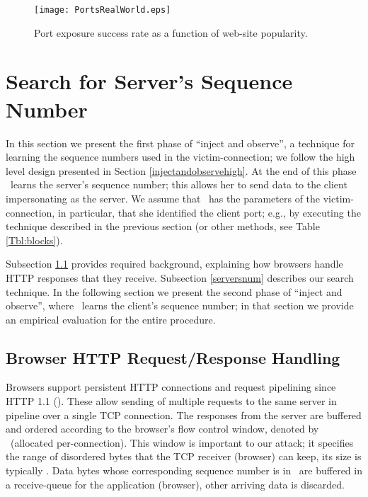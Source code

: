 \documentclass[conference]{IEEEtran}
\newcommand{\wnd}{}
\newcommand{\cwnd}{}
\begin{document}
{\begin{figure}
  \begin{center}
    \texttt{[image: PortsRealWorld.eps]}
  \end{center}
  \caption{Port exposure success rate as a function of web-site popularity.}
    \label{fig:portexposurereal}
\end{figure}
}



\section{Search for Server's Sequence Number} \label{serverseq}

In this section we present the first phase of ``inject and observe'', a technique for learning the sequence numbers used in the victim-connection; we follow the high level design presented in Section \ref{injectandobservehigh}. At the end of this phase \mal\ learns the server's sequence number; this allows her to send data to the client impersonating as the server. We assume that \mal\ has the parameters of the victim-connection, in particular, that she identified the client port; e.g., by executing the technique described in the previous section (or other methods, see Table \ref{Tbl:blocks}). 


 Subsection \ref{http} provides required background, explaining how browsers handle HTTP responses that they receive. Subsection \ref{serversnum} describes our search technique. In the following section we present the second phase of ``inject and observe'', where \mal\ learns the client's sequence number; in that section we provide an empirical evaluation for the entire procedure.

\subsection{Browser HTTP Request/Response Handling} \label{http}

Browsers support persistent HTTP connections and request pipelining since HTTP 1.1 (\cite{rfc2616}). These allow sending of multiple requests to the same server in pipeline over a single TCP connection. The responses from the server are buffered and ordered according to the browser's flow control window, denoted by \wnd\ (allocated per-connection). This window is important to our attack; it specifies the range of disordered bytes that the TCP receiver (browser) can keep, its size is typically . Data bytes whose corresponding sequence number is in \cwnd\ are buffered in a receive-queue for the application (browser), other arriving data is discarded.
\end{document}
